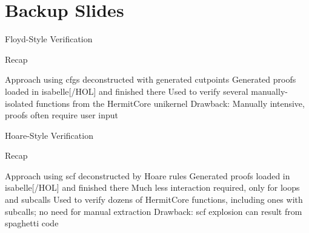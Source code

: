 \section{Backup Slides}
\begin{frame}[label=floyd]{Floyd-Style Verification}
    \begin{block}{Recap}
      \begin{outline}
        \1 Approach using \glspl{cfg} deconstructed with generated \alert{cutpoints}
        \1 Generated proofs loaded in \gls{isabelle}[/HOL] and finished there
        \1 Used to verify several manually-isolated functions from \alert{the HermitCore unikernel}
        \1 Drawback: Manually intensive, proofs often require user input
      \end{outline}
    \end{block}
%
\end{frame}

\begin{frame}[label=hoare]{Hoare-Style Verification}
    \begin{block}{Recap}
      \begin{outline}
        \1 Approach using \gls{scf} deconstructed by \alert{Hoare rules}
        \1 Generated proofs loaded in \gls{isabelle}[/HOL] and finished there
        \2 Much less interaction required, only for loops and subcalls
        \1 Used to verify dozens of HermitCore functions, including ones with subcalls; no need for manual extraction
        \1 Drawback: \gls{scf} explosion can result from spaghetti code
      \end{outline}
    \end{block}
%
\end{frame}

